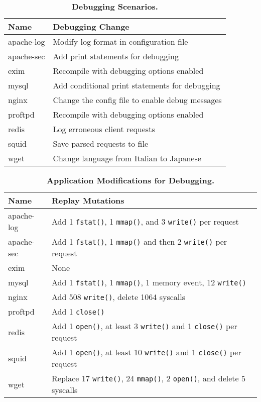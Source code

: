 \begin{table}[h]
\centering
\begin{tabular}{ll}
  \toprule
{\bf Name}     & {\bf Debugging Change}                          \\ \midrule
		apache-log & Modify log format in configuration file         \\
		apache-sec & Add print statements for debugging              \\
		exim       & Recompile with debugging options enabled        \\
		mysql      & Add conditional print statements for debugging  \\
		nginx      & Change the config file to enable debug messages \\
		proftpd    & Recompile with debugging options enabled        \\
		redis      & Log erroneous client requests                   \\
		squid      & Save parsed requests to file                    \\
		wget       & Change language from Italian to Japanese        \\
  \bottomrule
\end{tabular}
\caption{{\bf Debugging Scenarios.}}
\label{dora:tab:debugging-scenario}
\end{table}

\begin{table}
\centering
\begin{tabular}{ll}
  \toprule
{\bf Name}     & {\bf Replay Mutations}                                                           \\ \midrule
		apache-log & Add 1 {\tt fstat()}, 1 {\tt mmap()}, and 3 {\tt write()} per request             \\
		apache-sec & Add 1 {\tt fstat()}, 1 {\tt mmap()} and then 2 {\tt write()} per request         \\
		exim       & None                                                                             \\
		mysql      & Add 1 {\tt fstat()}, 1 {\tt mmap()}, 1 memory event, 12 {\tt write()}            \\
		nginx      & Add 508 {\tt write()}, delete 1064 syscalls                                      \\
		proftpd    & Add 1 {\tt close()}                                                              \\
		redis      & Add 1 {\tt open()}, at least 3 {\tt write()} and 1 {\tt close()} per request     \\
		squid      & Add 1 {\tt open()}, at least 10 {\tt write()} and 1 {\tt close()} per request    \\
		wget       & Replace 17 {\tt write()}, 24 {\tt mmap()}, 2 {\tt open()}, and delete 5 syscalls \\
  \bottomrule
\end{tabular}
\caption{{\bf Application Modifications for Debugging.}}
\label{dora:tab:debugging-mod}
\end{table}


